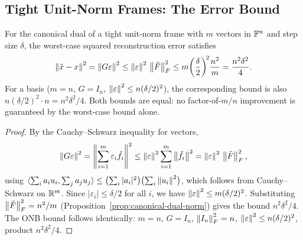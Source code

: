 \subsection{Tight Unit-Norm Frames: The Error Bound}
\label{subsec:tight-quant-bound}

\begin{proposition}
\label{prop:tight-quant-squared}
For the canonical dual of a tight unit-norm frame with $m$ vectors in
$\mathbb{F}^n$ and step size $\delta$, the worst-case squared reconstruction
error satisfies
\begin{equation}
\label{eq:tight-quant-bound}
  \left\| \hat x - x \right\|^2
  = \left\| G\varepsilon \right\|^2
  \le \left\| \varepsilon \right\|^2\,\left\| \tilde F \right\|_F^2
  \le m\!\left(\frac{\delta}{2}\right)^{\!2}\!\frac{n^2}{m}
  = \frac{n^2\delta^2}{4}.
\end{equation}
For a basis ($m=n$, $G=I_n$, $\left\| \varepsilon \right\|^2 \le n(\delta/2)^2$),
the corresponding bound is also $n(\delta/2)^2 \cdot n = n^2\delta^2/4$.
Both bounds are equal: no factor-of-$m/n$ improvement is guaranteed
by the worst-case bound alone.
\end{proposition}

\begin{proof}
By the Cauchy--Schwarz inequality for vectors,
\[
  \left\| G\varepsilon \right\|^2
  = \left\| \sum_{i=1}^m\varepsilon_i\tilde f_i \right\|^2
  \le \left\| \varepsilon \right\|^2\sum_{i=1}^m\left\| \tilde f_i \right\|^2
  = \left\| \varepsilon \right\|^2\,\left\| \tilde F \right\|_F^2,
\]
using $\langle\sum_i a_i u_i, \sum_j a_j u_j\rangle
\le \bigl(\sum_i|a_i|^2\bigr)\bigl(\sum_i\left\| u_i \right\|^2\bigr)$,
which follows from Cauchy--Schwarz on $\mathbb{R}^m$.
Since $|\varepsilon_i|\le\delta/2$ for all $i$, we have
$\left\| \varepsilon \right\|^2\le m(\delta/2)^2$. Substituting
$\left\| \tilde F \right\|_F^2=n^2/m$
(Proposition~\ref{prop:canonical-dual-norm}) gives the bound $n^2\delta^2/4$.
The ONB bound follows identically: $m=n$, $G=I_n$,
$\left\| I_n \right\|_F^2=n$, $\left\| \varepsilon \right\|^2\le n(\delta/2)^2$, product $n^2\delta^2/4$.
\end{proof}

